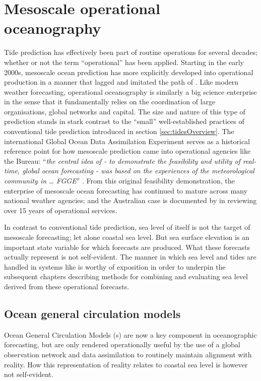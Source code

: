 \section{Mesoscale operational oceanography}
\label{sec:mesoscaleOperational}
Tide prediction has effectively been part of routine operations for several decades; whether or not the term ``operational'' has been applied.
Starting in the early 2000s, mesoscale ocean prediction has more explicitly developed into operational production in a manner that lagged and imitated the path of \NWP \citep{Harper:kb}. 
Like modern weather forecasting, operational oceanography is similarly a big science enterprise \citep{Petersen:2012tr} in the sense that it fundamentally relies on the coordination of large organisations, global networks and capital. 
The size and nature of this type of prediction stands in stark contrast to the ``small'' well-established practices of conventional tide prediction introduced in section \ref{sec:tidesOverview}.
The international Global Ocean Data Assimilation Experiment \GODAE{} serves as a historical reference point for how mesoscale prediction came into operational agencies like the Bureau:
``\textit{the central idea of \GODAE{} - to demonstrate the feasibility and utility of real-time, global ocean forecasting - was based on the experiences of the meteorological community in \dots{} FGGE}'' \citep{Bell:2009uv}.
From this original feasibility demonstration, the enterprise of mesoscale ocean forecasting has continued to mature across many national weather agencies; and the Australian case is documented by \citet{10.1080/1755876x.2019.1685834} in reviewing over 15 years of operational services.


In contrast to conventional tide prediction, sea level of itself is not the target of mesoscale forecasting; let alone coastal sea level.   But sea surface elevation is an important state variable for which forecasts are produced.  What these forecasts actually represent is not self-evident.  The manner in which sea level and tides are handled in systems like \BL{} is worthy of exposition in order to underpin the subsequent chapters describing methods for combining and evaluating sea level derived from these operational forecasts. 
  
\subsection{Ocean general circulation models}
Ocean General Circulation Models (\OGCM{}s) are now a key component in oceanographic forecasting, but are only rendered operationally useful by the use of a global observation network and data assimilation to routinely maintain alignment with reality.
How this representation of reality relates to coastal sea level is however not self-evident.



